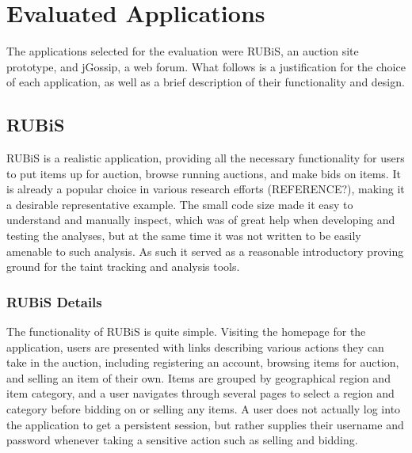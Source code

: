\documentclass[msc,oneside]{ubcthesis}
\begin{document}


\section{Evaluated Applications}
	The applications selected for the evaluation were RUBiS, an auction site prototype, and jGossip, a web forum. What follows is a justification for the choice of each application, as well as a brief description of their functionality and design.
	
\subsection{RUBiS}
RUBiS is a realistic application, providing all the necessary functionality for users to put items up for auction, browse running auctions, and make bids on items. It is already a popular choice in various research efforts (REFERENCE?), making it a desirable representative example. The small code size made it easy to understand and manually inspect, which was of great help when developing and testing the analyses, but at the same time it was not written to be easily amenable to such analysis. As such it served as a reasonable introductory proving ground for the taint tracking and analysis tools.

\subsubsection{RUBiS Details}
The functionality of RUBiS is quite simple. Visiting the homepage for the application, users are presented with links describing various actions they can take in the auction, including registering an account, browsing items for auction, and selling an item of their own. Items are grouped by geographical region and item category, and a user navigates through several pages to select a region and category before bidding on or selling any items. A user does not actually log into the application to get a persistent session, but rather supplies their username and password whenever taking a sensitive action such as selling and bidding.\\
\end{document}
